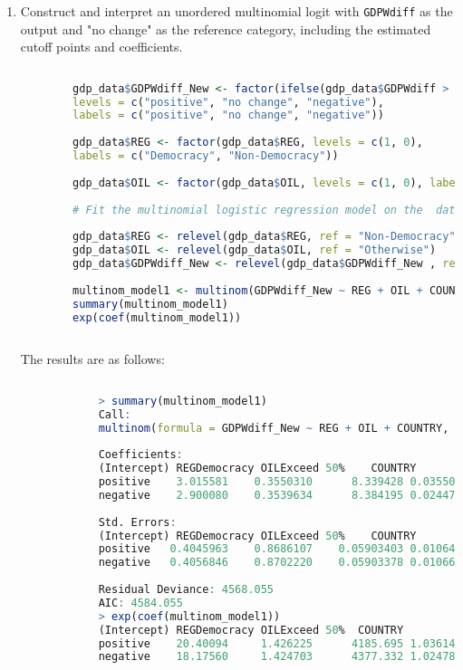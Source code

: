 \documentclass[12pt,letterpaper]{article}
\begin{document}
\begin{enumerate}
	\item Construct and interpret an unordered multinomial logit with \texttt{GDPWdiff} as the output and "no change" as the reference category, including the estimated cutoff points and coefficients.
	
	\begin{lstlisting}[language=R]
		
		gdp_data$GDPWdiff_New <- factor(ifelse(gdp_data$GDPWdiff > 0, "positive", ifelse(gdp_data$GDPWdiff < 0, "negative", "no change")),
		levels = c("positive", "no change", "negative"),
		labels = c("positive", "no change", "negative"))
		
		gdp_data$REG <- factor(gdp_data$REG, levels = c(1, 0),
		labels = c("Democracy", "Non-Democracy"))
				
		gdp_data$OIL <- factor(gdp_data$OIL, levels = c(1, 0), labels = c("Exceed 50%", "Otherwise"))
		
		# Fit the multinomial logistic regression model on the  data
		
		gdp_data$REG <- relevel(gdp_data$REG, ref = "Non-Democracy")
		gdp_data$OIL <- relevel(gdp_data$OIL, ref = "Otherwise")
		gdp_data$GDPWdiff_New <- relevel(gdp_data$GDPWdiff_New , ref = "no change")
		
		multinom_model1 <- multinom(GDPWdiff_New ~ REG + OIL + COUNTRY, data = gdp_data)
		summary(multinom_model1)
		exp(coef(multinom_model1))
		
	\end{lstlisting}
	
The results are as follows:

		\begin{lstlisting}[language=R]
			
			> summary(multinom_model1)
			Call:
			multinom(formula = GDPWdiff_New ~ REG + OIL + COUNTRY, data = gdp_data)
			
			Coefficients:
			(Intercept) REGDemocracy OILExceed 50%    COUNTRY
			positive    3.015581    0.3550310      8.339428 0.03550780
			negative    2.900080    0.3539634      8.384195 0.02447895
			
			Std. Errors:
			(Intercept) REGDemocracy OILExceed 50%    COUNTRY
			positive   0.4045963    0.8686107    0.05903403 0.01064706
			negative   0.4056846    0.8702220    0.05903378 0.01066312
			
			Residual Deviance: 4568.055 
			AIC: 4584.055 
			> exp(coef(multinom_model1))
			(Intercept) REGDemocracy OILExceed 50%  COUNTRY
			positive    20.40094     1.426225      4185.695 1.036146
			negative    18.17560     1.424703      4377.332 1.024781
			

\end{lstlisting}
\end{enumerate}
\end{document}

